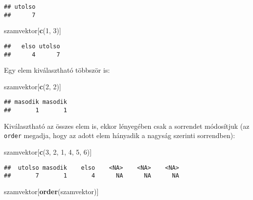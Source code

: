 \documentclass[]{book}
\newenvironment{Shaded}{\begin{snugshade}}{\end{snugshade}}
\newcommand{\DecValTok}[1]{\textcolor[rgb]{0.00,0.00,0.81}{#1}}
\newcommand{\KeywordTok}[1]{\textcolor[rgb]{0.13,0.29,0.53}{\textbf{#1}}}
\newcommand{\NormalTok}[1]{#1}
\begin{document}
\begin{verbatim}
## utolso 
##      7
\end{verbatim}

\begin{Shaded}
\begin{Highlighting}[]
\NormalTok{szamvektor[}\KeywordTok{c}\NormalTok{(}\DecValTok{1}\NormalTok{, }\DecValTok{3}\NormalTok{)]}
\end{Highlighting}
\end{Shaded}

\begin{verbatim}
##   elso utolso 
##      4      7
\end{verbatim}

Egy elem kiválasztható többször is:

\begin{Shaded}
\begin{Highlighting}[]
\NormalTok{szamvektor[}\KeywordTok{c}\NormalTok{(}\DecValTok{2}\NormalTok{, }\DecValTok{2}\NormalTok{)]}
\end{Highlighting}
\end{Shaded}

\begin{verbatim}
## masodik masodik 
##       1       1
\end{verbatim}

Kiválasztható az összes elem is, ekkor lényegében csak a sorrendet módosítjuk (az \texttt{order} megadja, hogy az adott elem hányadik a nagyság szerinti sorrendben):

\begin{Shaded}
\begin{Highlighting}[]
\NormalTok{szamvektor[}\KeywordTok{c}\NormalTok{(}\DecValTok{3}\NormalTok{, }\DecValTok{2}\NormalTok{, }\DecValTok{1}\NormalTok{, }\DecValTok{4}\NormalTok{, }\DecValTok{5}\NormalTok{, }\DecValTok{6}\NormalTok{)]}
\end{Highlighting}
\end{Shaded}

\begin{verbatim}
##  utolso masodik    elso    <NA>    <NA>    <NA> 
##       7       1       4      NA      NA      NA
\end{verbatim}

\begin{Shaded}
\begin{Highlighting}[]
\NormalTok{szamvektor[}\KeywordTok{order}\NormalTok{(szamvektor)]}
\end{Highlighting}
\end{Shaded}
\end{document}
